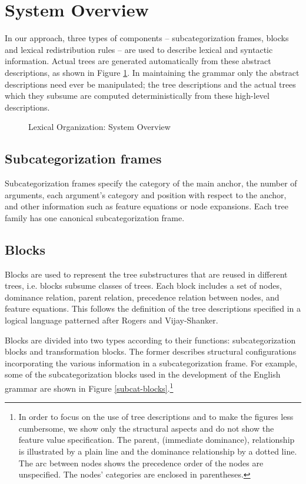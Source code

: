\section{System Overview}

In our approach,  
three types of components -- subcategorization frames, blocks and
lexical redistribution rules -- are used to describe lexical and
syntactic information.
Actual trees are generated automatically from these abstract descriptions,
as shown in Figure \ref{system-overview}.
In maintaining the grammar only the abstract
descriptions need ever be manipulated; the tree descriptions and the
actual trees which they subsume are computed deterministically from these
high-level descriptions. 


\begin{figure}[htb]
\centerline{}
\caption{Lexical Organization: System Overview}
\label{system-overview}
\end{figure}

\subsection{Subcategorization frames}
Subcategorization frames specify
the category of the main anchor, 
the number of  arguments,
each argument's category and position with respect to the anchor,
and other information
such as feature equations or node expansions.
Each tree family has one canonical subcategorization frame.

\subsection{Blocks}

Blocks are used to represent the tree substructures that are reused
in different trees, i.e. blocks 
subsume classes of trees. Each block includes
a set of nodes, dominance relation, parent relation, 
precedence relation between nodes,
and feature equations. This follows the definition of the tree 
descriptions specified in a logical language patterned after Rogers and
Vijay-Shanker\cite{rogers-vijay94}. 

Blocks are divided into two types according to their functions: 
subcategorization  blocks
and transformation blocks. 
The former describes structural configurations incorporating
the various information in a subcategorization frame. 
For example, some of the subcategorization blocks
used in the
development of the English grammar are shown in Figure 
\ref{subcat-blocks}.\footnote{
In order to focus on the use of tree descriptions and to 
make the figures less cumbersome, we show only
the structural aspects and do not show the feature value specification.
The parent, (immediate dominance), relationship is illustrated by
a plain line and the dominance relationship by a dotted line.
The arc between nodes shows the precedence order of
the nodes are unspecified. The nodes' categories
are enclosed in parentheses.}

